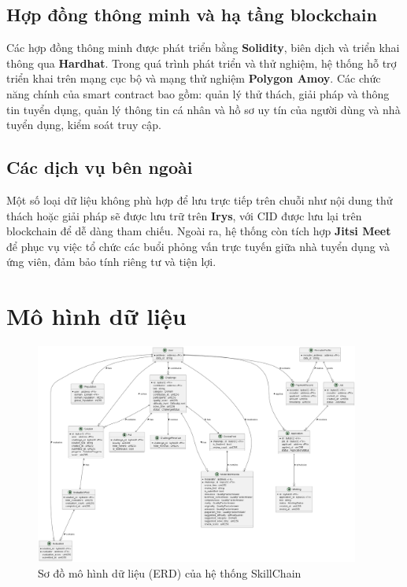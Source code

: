 \subsection{Hợp đồng thông minh và hạ tầng blockchain}

Các hợp đồng thông minh được phát triển bằng \textbf{Solidity}, biên dịch và triển khai thông qua \textbf{Hardhat}. Trong quá trình phát triển và thử nghiệm, hệ thống hỗ trợ triển khai trên mạng cục bộ và mạng thử nghiệm \textbf{Polygon Amoy}.
Các chức năng chính của smart contract bao gồm: quản lý thử thách, giải pháp và thông tin tuyển dụng, quản lý thông tin cá nhân và hồ sơ uy tín của người dùng và nhà tuyển dụng, kiểm soát truy cập.

\subsection{Các dịch vụ bên ngoài}

Một số loại dữ liệu không phù hợp để lưu trực tiếp trên chuỗi như nội dung thử thách hoặc giải pháp sẽ được lưu trữ trên \textbf{Irys}, với CID được lưu lại trên blockchain để dễ dàng tham chiếu.
Ngoài ra, hệ thống còn tích hợp \textbf{Jitsi Meet} để phục vụ việc tổ chức các buổi phỏng vấn trực tuyến giữa nhà tuyển dụng và ứng viên, đảm bảo tính riêng tư và tiện lợi.


\section{Mô hình dữ liệu}

\begin{figure}[H]
  \centering
  \includegraphics[width=0.95\textwidth]{../images/ERD.png}
  \caption{Sơ đồ mô hình dữ liệu (ERD) của hệ thống SkillChain}
  \label{fig:erd}
\end{figure}

